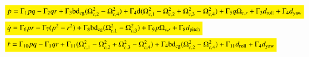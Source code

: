 \documentclass[3p]{elsarticle}
\begin{document}



\begin{align}
    &\colorbox{yellow}{$\dot{p} = \Gamma_1 pq - \Gamma_2 qr + \Gamma_3 \mathrm{b}\mathrm{d}_{\text{cg}} (\Omega_{c, 2}^2 - \Omega_{c, 4}^2) + \Gamma_4 \mathrm{d} (\Omega_{c, 1}^2 - \Omega_{c, 2}^2 + \Omega_{c, 3}^2 - \Omega_{c, 4}^2) + \Gamma_5 q \Omega_{c, r} + \Gamma_3 d_{\text{roll}} + \Gamma_4 d_{\text{yaw}}$} \\
    &\colorbox{yellow}{$\dot{q} = \Gamma_6 pr - \Gamma_7 (p^2 - r^2) + \Gamma_8  \mathrm{b}\mathrm{d}_{\text{cg}}(\Omega_{c, 1}^2 - \Omega_{c, 3}^2) + \Gamma_9 p \Omega_{c, r} + \Gamma_8 d_{\text{pitch}}$} \\
    &\colorbox{yellow}{$\dot{r} = \Gamma_{10} pq - \Gamma_{1} qr + \Gamma_{11} (\Omega_{c, 1}^2 - \Omega_{c, 2}^2 + \Omega_{c, 3}^2 - \Omega_{c, 4}^2) + \Gamma_{4}  \mathrm{b}\mathrm{d}_{\text{cg}} (\Omega_{c, 2}^2 - \Omega_{c, 4}^2) + \Gamma_{11} d_{\text{roll}} + \Gamma_{4} d_{\text{yaw}}$}
\end{align}
\end{document}
